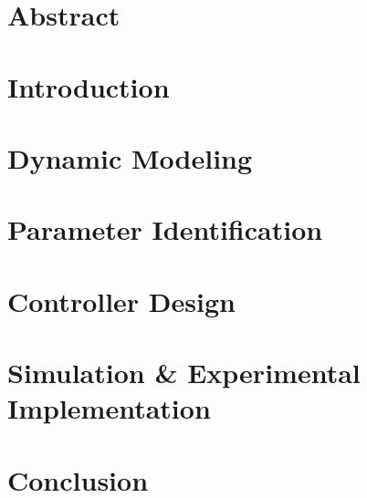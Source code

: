 \documentclass[11pt,twoside]{report}
\begin{document}

\thispagestyle{empty}



\chapter*{Abstract}

\cleardoublepage

\tableofcontents

\cleardoublepage

\cleardoublepage







\chapter{Introduction}

\cleardoublepage

\chapter{Dynamic Modeling}

\cleardoublepage

\chapter{Parameter Identification}

\cleardoublepage


\chapter{Controller Design}
%


\chapter{Simulation \& Experimental Implementation}
%

\chapter{Conclusion}
%

%
\end{document}
